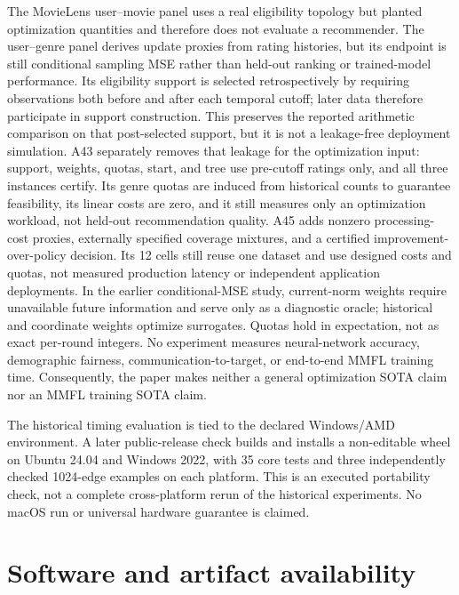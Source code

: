 \documentclass[smallextended,envcountsect]{svjour3}
\begin{document}
The MovieLens user--movie panel uses a real eligibility topology but planted
optimization quantities and therefore does not evaluate a recommender.  The
user--genre panel derives update proxies from rating histories, but its endpoint
is still conditional sampling MSE rather than held-out ranking or trained-model
performance.  Its eligibility support is selected retrospectively by requiring
observations both before and after each temporal cutoff; later data therefore
participate in support construction.  This preserves the reported arithmetic
comparison on that post-selected support, but it is not a leakage-free
deployment simulation.  A43 separately removes that leakage for the
optimization input: support, weights, quotas, start, and tree use pre-cutoff
ratings only, and all three instances certify.  Its genre quotas are induced
from historical counts to guarantee feasibility, its linear costs are zero,
and it still measures only an optimization workload, not held-out
recommendation quality. A45 adds nonzero processing-cost proxies, externally
specified coverage mixtures, and a certified improvement-over-policy decision.
Its 12 cells still reuse one dataset and use designed costs and quotas, not
measured production latency or independent application deployments.
In the earlier conditional-MSE study, current-norm
weights require unavailable future information and serve only as a diagnostic
oracle; historical and coordinate weights optimize surrogates.  Quotas hold in
expectation, not as exact per-round integers.  No
experiment measures neural-network accuracy, demographic fairness,
communication-to-target, or end-to-end MMFL training time.  Consequently, the
paper makes neither a general optimization SOTA claim nor an MMFL training SOTA
claim.

The historical timing evaluation is tied to the declared Windows/AMD
environment. A later public-release check builds and installs a non-editable
wheel on Ubuntu 24.04 and Windows 2022, with 35 core tests and three
independently checked 1024-edge examples on each platform. This is an
executed portability check, not a complete cross-platform rerun of the
historical experiments. No macOS run or universal hardware guarantee is claimed.

\section{Software and artifact availability}
\label{sec:availability}
\end{document}
